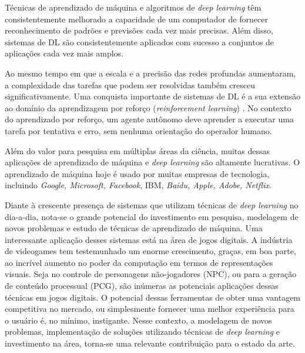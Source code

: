 Técnicas de aprendizado de máquina e algoritmos de \textit{deep learning} têm consistentemente melhorado a capacidade de um computador de fornecer reconhecimento de padrões e previsões cada vez mais precisas. Além disso, sistemas de DL são consistentemente aplicados com sucesso a conjuntos de aplicações cada vez mais amplos.

Ao mesmo tempo em que a escala e a precisão das redes profundas aumentaram, a complexidade das tarefas que podem ser resolvidas também cresceu significativamente. 
Uma conquista importante de sistemas de DL é a sua extensão ao domínio da aprendizagem por reforço (\textit{reinforcement learning}) \cite{reinforcement-learning-intro-2018}. No contexto do aprendizado por reforço, um agente autônomo deve aprender a executar uma tarefa por tentativa e erro, sem nenhuma orientação do operador humano. 

Além do valor para pesquisa em múltiplas áreas da ciência, muitas dessas aplicações de aprendizado de máquina e \textit{deep learning} são altamente lucrativas. O aprendizado de máquina hoje é usado por muitas empresas de tecnologia, incluindo \textit{Google, Microsoft, Facebook}, IBM, \textit{Baidu, Apple, Adobe, Netflix}.

Diante à crescente presença de sistemas que utilizam técnicas de \textit{deep learning} no dia-a-dia, nota-se o grande potencial do investimento em pesquisa, modelagem de novos problemas e estudo de técnicas de aprendizado de máquina. 
%
Uma interessante aplicação desses sistemas está na área de jogos digitais. A indústria de videogames tem testemunhado um enorme crescimento, graças, em boa parte, ao incrível aumento no poder da computação em termos de representações visuais. 
%
%
Seja no controle de personagens não-jogadores (NPC), ou para a geração de conteúdo processual (PCG), são inúmeras as potenciais aplicações dessas técnicas em jogos digitais.
%
O potencial dessas ferramentas de obter uma vantagem competitiva no mercado, ou simplesmente fornecer uma melhor experiência para o usuário é, no mínimo, instigante.
%
Nesse contexto, a modelagem de novos problemas, implementação de soluções utilizando técnicas de \textit{deep learning} e investimento na área, torna-se uma relevante contribuição para o estado da arte.


